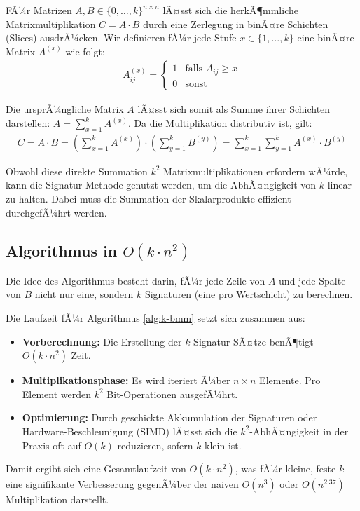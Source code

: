 ﻿\documentclass[a4paper,12pt]{article}
\theoremstyle{definition}
\begin{document}
FÃ¼r Matrizen $A, B \in \{0, \dots, k\}^{n \times n}$ lÃ¤sst sich die herkÃ¶mmliche Matrixmultiplikation $C = A \cdot B$ durch eine Zerlegung in binÃ¤re Schichten (Slices) ausdrÃ¼cken. Wir definieren fÃ¼r jede Stufe $x \in \{1, \dots, k\}$ eine binÃ¤re Matrix $A^{(x)}$ wie folgt:
\begin{align}
	A^{(x)}_{ij} = \begin{cases} 1 & \text{falls } A_{ij} \geq x \\ 0 & \text{sonst} \end{cases}
\end{align}

Die ursprÃ¼ngliche Matrix $A$ lÃ¤sst sich somit als Summe ihrer Schichten darstellen: $A = \sum_{x=1}^{k} A^{(x)}$. Da die Multiplikation distributiv ist, gilt:
\begin{align}
	C = A \cdot B = \left( \sum_{x=1}^{k} A^{(x)} \right) \cdot \left( \sum_{y=1}^{k} B^{(y)} \right) = \sum_{x=1}^{k} \sum_{y=1}^{k} A^{(x)} \cdot B^{(y)}
\end{align}

Obwohl diese direkte Summation $k^2$ Matrixmultiplikationen erfordern wÃ¼rde, kann die Signatur-Methode genutzt werden, um die AbhÃ¤ngigkeit von $k$ linear zu halten. Dabei muss die Summation der Skalarprodukte effizient durchgefÃ¼hrt werden.

\subsection{Algorithmus in $O(k \cdot n^2)$}

Die Idee des Algorithmus besteht darin, fÃ¼r jede Zeile von $A$ und jede Spalte von $B$ nicht nur eine, sondern $k$ Signaturen (eine pro Wertschicht) zu berechnen.

Die Laufzeit fÃ¼r Algorithmus \ref*{alg:k-bmm} setzt sich zusammen aus:
\begin{itemize}
	\item \textbf{Vorberechnung:} Die Erstellung der $k$ Signatur-SÃ¤tze benÃ¶tigt $O(k \cdot n^2)$ Zeit.
	\item \textbf{Multiplikationsphase:} Es wird iteriert Ã¼ber $n \times n$ Elemente. Pro Element werden $k^2$ Bit-Operationen ausgefÃ¼hrt.
	\item \textbf{Optimierung:} Durch geschickte Akkumulation der Signaturen oder Hardware-Beschleunigung (SIMD) lÃ¤sst sich die $k^2$-AbhÃ¤ngigkeit in der Praxis oft auf $O(k)$ reduzieren, sofern $k$ klein ist.
\end{itemize}
Damit ergibt sich eine Gesamtlaufzeit von $O(k \cdot n^2)$, was fÃ¼r kleine, feste $k$ eine signifikante Verbesserung gegenÃ¼ber der naiven $O(n^3)$ oder $O(n^{2.37})$ Multiplikation darstellt.
\end{document}
